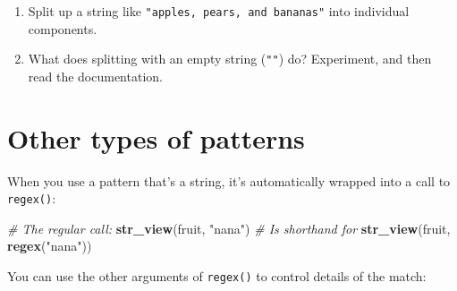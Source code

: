 \documentclass[]{book}
\newenvironment{Shaded}{\begin{snugshade}}{\end{snugshade}}
\newcommand{\CommentTok}[1]{\textcolor[rgb]{0.56,0.35,0.01}{\textit{#1}}}
\newcommand{\KeywordTok}[1]{\textcolor[rgb]{0.13,0.29,0.53}{\textbf{#1}}}
\newcommand{\NormalTok}[1]{#1}
\newcommand{\StringTok}[1]{\textcolor[rgb]{0.31,0.60,0.02}{#1}}
\begin{document}
\begin{enumerate}
\def\labelenumi{\arabic{enumi}.}
\item
  Split up a string like \texttt{"apples,\ pears,\ and\ bananas"} into individual
  components.
\item
  What does splitting with an empty string (\texttt{""}) do? Experiment, and
  then read the documentation.
\end{enumerate}

\hypertarget{other-types-of-patterns}{%
\section{Other types of patterns}\label{other-types-of-patterns}}

When you use a pattern that's a string, it's automatically wrapped into a call to \texttt{regex()}:

\begin{Shaded}
\begin{Highlighting}[]
\CommentTok{# The regular call:}
\KeywordTok{str_view}\NormalTok{(fruit, }\StringTok{"nana"}\NormalTok{)}
\CommentTok{# Is shorthand for}
\KeywordTok{str_view}\NormalTok{(fruit, }\KeywordTok{regex}\NormalTok{(}\StringTok{"nana"}\NormalTok{))}
\end{Highlighting}
\end{Shaded}

You can use the other arguments of \texttt{regex()} to control details of the match:
\end{document}

